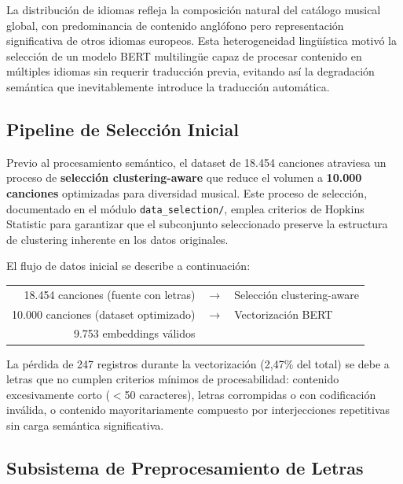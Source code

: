 La distribución de idiomas refleja la composición natural del catálogo musical global, con predominancia de contenido anglófono pero representación significativa de otros idiomas europeos. Esta heterogeneidad lingüística motivó la selección de un modelo BERT multilingüe capaz de procesar contenido en múltiples idiomas sin requerir traducción previa, evitando así la degradación semántica que inevitablemente introduce la traducción automática.

\subsection{Pipeline de Selección Inicial}
\label{subsec:pipeline-seleccion}

Previo al procesamiento semántico, el dataset de 18.454 canciones atraviesa un proceso de \textbf{selección clustering-aware} que reduce el volumen a \textbf{10.000 canciones} optimizadas para diversidad musical. Este proceso de selección, documentado en el módulo \texttt{data\_selection/}, emplea criterios de Hopkins Statistic para garantizar que el subconjunto seleccionado preserve la estructura de clustering inherente en los datos originales.

El flujo de datos inicial se describe a continuación:

\begin{center}
\begin{tabular}{rcl}
18.454 canciones (fuente con letras) & $\rightarrow$ & Selección clustering-aware \\
10.000 canciones (dataset optimizado) & $\rightarrow$ & Vectorización BERT \\
9.753 embeddings válidos & &  \\
\end{tabular}
\end{center}

La pérdida de 247 registros durante la vectorización (2,47\% del total) se debe a letras que no cumplen criterios mínimos de procesabilidad: contenido excesivamente corto ($<$50 caracteres), letras corrompidas o con codificación inválida, o contenido mayoritariamente compuesto por interjecciones repetitivas sin carga semántica significativa.

\subsection{Subsistema de Preprocesamiento de Letras}
\label{subsec:preprocesamiento-letras}

